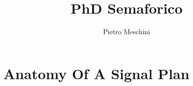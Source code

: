 \documentclass{mzkThesis}
\author{Pietro Meschini}
\title{PhD Semaforico}
\begin{document}
\frontmatter



\mainmatter
\chapter{Anatomy Of A Signal Plan}



\appendix

\backmatter
\end{document}
